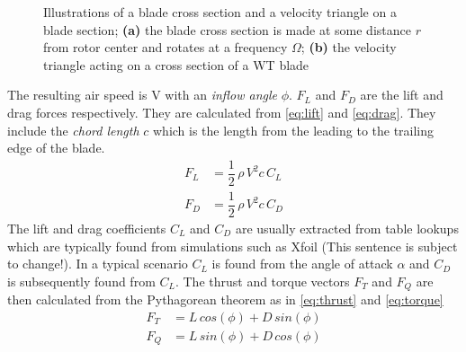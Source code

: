 \begin{figure}[!t]
	\centering
	\hfil
	\caption{Illustrations of a blade cross section and a velocity triangle on a blade section; \textbf{(a)} the blade cross section is made at some distance $ r $ from rotor center and rotates at a frequency $ \Omega $; \textbf{(b)} the velocity triangle acting on a cross section of a WT blade}
	\label{fig:blade_triangles}
\end{figure}

The resulting air speed is V with an \textit{inflow angle} $ \phi $. $ F_L $ and $ F_D $ are the lift and drag forces respectively. They are calculated from \cref{eq:lift} and \cref{eq:drag}. They include the \textit{chord length} $ c $ which is the length from the leading to the trailing edge of the blade.
\begin{align}
	F_L &= \dfrac{1}{2}\,  \rho \, V^2 c \, C_L \label{eq:lift}\\
	F_D &= \dfrac{1}{2} \, \rho \, V^2 c \, C_D \label{eq:drag}
\end{align}
The lift and drag coefficients $ C_L $ and $ C_D $ are usually extracted from table lookups which are typically found from simulations such as Xfoil (This sentence is subject to change!). In a typical scenario $ C_L $ is found from the angle of attack $ \alpha $ and $ C_D $ is subsequently found from $ C_L $. The thrust and torque vectors $ F_T $ and $ F_Q $ are then calculated from the Pythagorean theorem as in \cref{eq:thrust} and \cref{eq:torque}
\begin{align}
	F_T &= L \, cos(\phi) + D \, sin(\phi) \label{eq:thrust} \\
	F_Q &= L \, sin(\phi) + D \, cos(\phi) \label{eq:torque}
\end{align}
